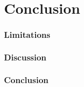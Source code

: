 \chapter{Conclusion}
\label{chap_conclusion}


\subsection{Limitations}
\label{ch6:sec:limitations}

\subsection{Discussion}
\label{ch6:sec:discussion}

\subsection{Conclusion}
\label{ch6:sec:conclusion}
